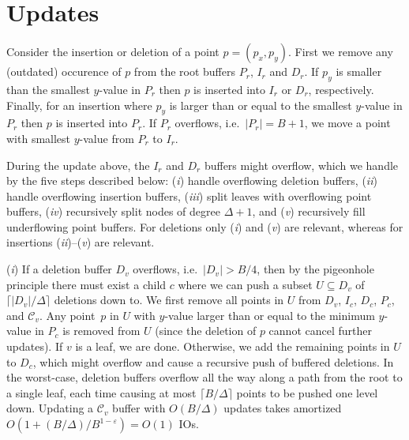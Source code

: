 \documentclass[11pt]{article}
\begin{document}
\section{Updates}
\label{sec:updates}

Consider the insertion or deletion of a point $p=(p_x,p_y)$. First we
remove any (outdated) occurence of $p$ from the root buffers $P_r$,
$I_r$ and $D_r$. If $p_y$ is smaller than the smallest $y$-value in
$P_r$ then $p$ is inserted into $I_r$ or $D_r$, respectively. Finally,
for an insertion where $p_y$ is larger than or equal to the smallest
$y$-value in $P_r$ then $p$ is inserted into $P_r$. If $P_r$
overflows, i.e.\ $|P_r|=B+1$, we move a point with smallest $y$-value
from $P_r$ to $I_r$.

During the update above, the $I_r$ and $D_r$ buffers might overflow,
which we handle by the five steps described below: (\textit{i}) handle
overflowing deletion buffers, (\textit{ii}) handle overflowing
insertion buffers, (\textit{iii}) split leaves with overflowing point
buffers, (\textit{iv}) recursively split nodes of degree $\Delta+1$,
and (\textit{v}) recursively fill underflowing point buffers. For
deletions only (\textit{i}) and (\textit{v}) are relevant, whereas for
insertions (\textit{ii})--(\textit{v}) are relevant.

(\textit{i}) If a deletion buffer $D_v$ overflows, i.e.\ $|D_v|>B/4$,
then by the pigeonhole principle there must exist a child $c$ where we
can push a subset $U\subseteq D_v$ of $\lceil|D_v|/\Delta\rceil$
deletions down to. We first remove all points in $U$ from $D_v$,
$I_c$, $D_c$, $P_c$, and $\mathcal{C}_v$. Any point~$p$ in $U$ with
$y$-value larger than or equal to the minimum $y$-value in $P_c$ is
removed from $U$ (since the deletion of $p$ cannot cancel further
updates). If $v$ is a leaf, we are done. Otherwise, we add the
remaining points in $U$ to $D_c$, which might overflow and cause a
recursive push of buffered deletions.  In the worst-case, deletion
buffers overflow all the way along a path from the root to a single
leaf, each time causing at most $\lceil B/\Delta\rceil$ points to be
pushed one level down. Updating a $\mathcal{C}_v$ buffer with
$O(B/\Delta)$ updates takes amortized
$O(1+(B/\Delta)/B^{1-\varepsilon})=O(1)$ IOs.
\end{document}
